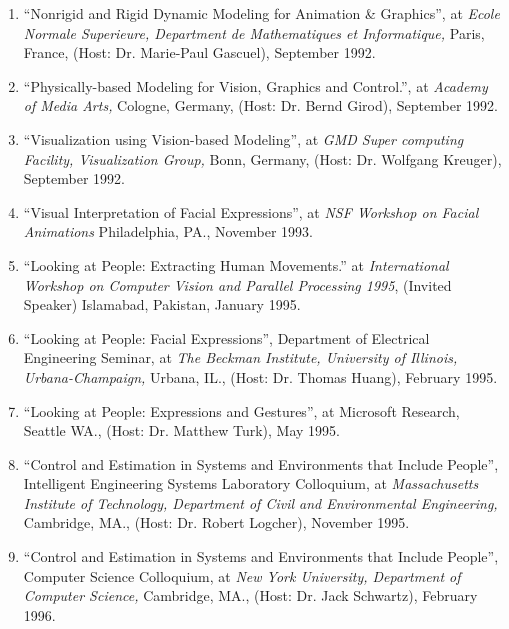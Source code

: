 \begin{enumerate}

\item ``Nonrigid and Rigid Dynamic Modeling for Animation \&
Graphics'', at \textit{Ecole Normale Superieure, Department de
Mathematiques et Informatique,} Paris, France, (Host: Dr.
Marie-Paul Gascuel), September 1992.

\item ``Physically-based Modeling for Vision, Graphics and
Control.'', at \textit{Academy of Media Arts,} Cologne, Germany,
(Host: Dr. Bernd Girod), September 1992.

\item ``Visualization using Vision-based Modeling'', at \textit{GMD
Super computing Facility, Visualization Group,} Bonn, Germany,
(Host: Dr. Wolfgang Kreuger), September 1992.

\item ``Visual Interpretation of Facial Expre\-ssions'', at
\textit{NSF Work\-shop on Facial Anima\-tions} Phi\-ladelphia,
PA., November 1993.

\item ``Looking at People: Extracting Human Movements.'' at
\textit{International Workshop on Computer Vision and Parallel
Processing 1995}, (Invited Speaker) Islamabad, Pakistan, January
1995.

\item ``Looking at People: Facial Expressions'', Department of Electrical
Engineering Seminar, at \textit{The Beckman Institute, University of Illinois, Urbana-Champaign,} Urbana, IL., (Host: Dr. Thomas Huang), February
1995.

\item ``Looking at People: Expressions and Gestures'', at Microsoft Research,
Seattle WA., (Host: Dr. Matthew Turk), May 1995.

\item ``Control and Estimation in Systems and Environments that Include People'',
Intelligent Engineering Systems Laboratory Colloquium, at \textit{Massachusetts Institute of Technology, Department of Civil and Environmental Engineering,} Cambridge, MA.,
(Host: Dr. Robert Logcher), November 1995.

\item ``Control and Estimation in Systems and Environments that Include People'',
Computer Science Colloquium, at \textit{New York University, Department of Computer Science,} Cambridge, MA., (Host: Dr. Jack Schwartz),
February 1996.


\end{enumerate}
